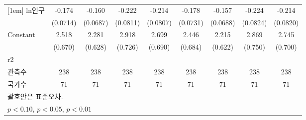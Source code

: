 \begin{table}[htbp]
{\begin{tabular}{l*{8}{c}}
[1em]
ln인구            &      -0.174\sym{**} &      -0.160\sym{**} &      -0.222\sym{***}&      -0.214\sym{***}&      -0.178\sym{**} &      -0.157\sym{**} &      -0.224\sym{***}&      -0.214\sym{***}\\
                    &    (0.0714)         &    (0.0687)         &    (0.0811)         &    (0.0807)         &    (0.0731)         &    (0.0688)         &    (0.0824)         &    (0.0820)         \\
[1em]
Constant            &       2.518\sym{***}&       2.281\sym{***}&       2.918\sym{***}&       2.699\sym{***}&       2.446\sym{***}&       2.215\sym{***}&       2.869\sym{***}&       2.745\sym{***}\\
                    &     (0.670)         &     (0.628)         &     (0.726)         &     (0.690)         &     (0.684)         &     (0.622)         &     (0.750)         &     (0.700)         \\
\hline
r2                  &                     &                     &                     &                     &                     &                     &                     &                     \\
관측수                   &         238         &         238         &         238         &         238         &         238         &         238         &         238         &         238         \\
국가수                 &          71         &          71         &          71         &          71         &          71         &          71         &          71         &          71         \\
\hline\hline
\multicolumn{9}{l}{\footnotesize  괄호안은 표준오차.}\\
\multicolumn{9}{l}{\footnotesize \sym{*} \(p<0.10\), \sym{**} \(p<0.05\), \sym{***} \(p<0.01\)}\\
\end{tabular}}
\end{table}
